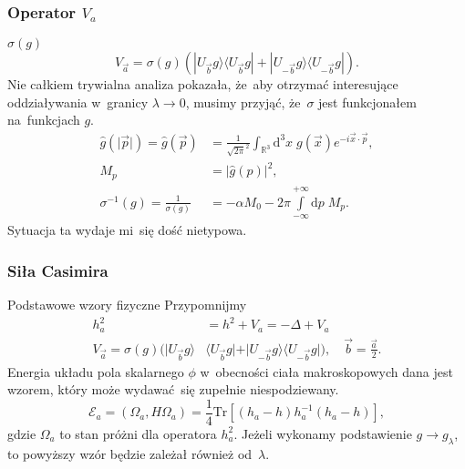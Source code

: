 \documentclass{beamer} \mode<presentation>
\newcommand{\fr}{\frac}
\newcommand{\wh}{\widehat}
\newcommand{\mr}{\mathrm}
\newcommand{\mb}{\mathbb}
\newcommand{\mc}{\mathcal}
\newcommand{\ra}{\rightarrow}
\newcommand{\al}{\alpha}
\newcommand{\Del}{\Delta}
\newcommand{\la}{\lambda}
\newcommand{\Om}{\Omega}
\newcommand{\si}{\sigma}
\newcommand{\R}{\mb{R}}
\newcommand{\Tr}{\mr{Tr}}
\newcommand{\de}{\mr{d}}
\newcommand{\Int}{\int\limits}
\newcommand{\IntA}[1]{\Int_{ -\infty }^{ +\infty } \de #1 \;}
\newcommand{\IntWie}[3]{ \int_{ #1 } \de^{ #2 }#3 \; } %
\newcommand{\lket}{\langle}
\newcommand{\rket}{\rangle}
\providecommand{\absj}[1]{\lvert #1 \rvert}
\newcommand{\veca}{\vec{ a }}
\newcommand{\vecb}{\vec{ b }}
\newcommand{\vecx}{\vec{ x }}
\newcommand{\vecp}{\vec{ p }}
\newcommand{\g}{\wh{ g }}
\newcommand{\gl}{g_{ \la }}
\begin{document}
\begin{frame}
  \frametitle{Operator $V_{ a }$}

  \begin{block}{$\si( g )$}
    \begin{equation}
      \label{eq:EC09}
      V_{ \veca } = \si( g ) ( | U_{ \vecb } g \rket \lket U_{ \vecb } g |
      + | U_{ -\vecb } g \rket \lket U_{ -\vecb } g | ).
    \end{equation}
    Nie całkiem trywialna analiza pokazała, że~aby otrzymać
    interesujące oddziaływania w~granicy $\la \ra 0$, musimy przyjąć,
    że~$\si$ jest funkcjonałem na~funkcjach $g$.
    \begin{align}
      \label{eq:EC10}
      \g( \absj{ \vecp } ) = \g( \vecp ) &=  \fr{ 1 }{ \sqrt{ 2 \pi }^{ 2 } }
                                           \IntWie{ \R^{ 3 } }{ 3 }{ x } g( \vecx )
                                           e^{ -i \vecx \cdot \vecp }, \\
      M_{ p } &= \absj{ \g( p ) }^{ 2 }, \\
      \si^{ -1 }( g ) = \fr{ 1 }{ \si( g ) } &= -\al M_{ 0 }
                                               - 2 \pi \IntA{ p } M_{ p }.
    \end{align}
    Sytuacja ta wydaje mi~się dość nietypowa.
  \end{block}
  
\end{frame}



\begin{frame}
  \frametitle{Siła Casimira}

  \begin{block}{Podstawowe wzory fizyczne}
    Przypomnijmy
    \begin{align}
      \label{eq:EC11}
      h_{ a }^{ 2 } &= h^{ 2 } + V_{ a } = -\Del + V_{ a } \\
      V_{ \veca } = \si( g ) ( | U_{ \vecb } g \rket & \lket U_{ \vecb } g |
                                                       + | U_{ -\vecb } g \rket \lket U_{ -\vecb } g | ), \quad
                                                       \vecb = \fr{ \veca }{ 2 }.
    \end{align}
    Energia układu pola skalarnego $\phi$ w~obecności ciała
    makroskopowych dana jest wzorem, który może wydawać~się zupełnie
    niespodziewany.
    \begin{equation}
      \label{eq:EC12}
      \mc{E}_{ a } = (\Om_{ a }, H \Om_{ a } ) = \fr{ 1 }{ 4 } \Tr[ ( h_{ a } - h )
      h_{ a }^{ -1 } ( h_{ a } - h ) ],
    \end{equation}
    gdzie $\Om_{ a }$ to stan próżni dla operatora $h_{ a }^{ 2 }$.
    Jeżeli wykonamy podstawienie $g \ra \gl$, to powyższy wzór będzie
    zależał również od~$\la$.
  \end{block}
  
\end{frame}
\end{document}
